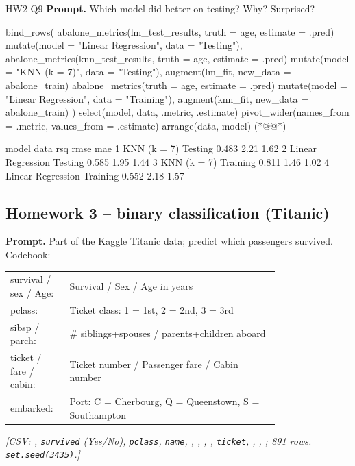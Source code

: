\begin{qbox}{HW2 Q9}
\textbf{Prompt.} Which model did better on testing? Why? Surprised?
\mine
\begin{rcode}
bind_rows(
  abalone_metrics(lm_test_results, truth = age, estimate = .pred) %
    mutate(model = "Linear Regression", data = "Testing"),
  abalone_metrics(knn_test_results, truth = age, estimate = .pred) %
    mutate(model = "KNN (k = 7)", data = "Testing"),
  augment(lm_fit, new_data = abalone_train) %
    abalone_metrics(truth = age, estimate = .pred) %
    mutate(model = "Linear Regression", data = "Training"),
  augment(knn_fit, new_data = abalone_train) %
) %
  select(model, data, .metric, .estimate) %
  pivot_wider(names_from = .metric, values_from = .estimate) %
  arrange(data, model)  (*@@*)
\end{rcode}
\begin{routput}
  model             data       rsq  rmse   mae
1 KNN (k = 7)       Testing  0.483  2.21  1.62
2 Linear Regression Testing  0.585  1.95  1.44
3 KNN (k = 7)       Training 0.811  1.46  1.02
4 Linear Regression Training 0.552  2.18  1.57
\end{routput}
\end{qbox}

\subsection{Homework 3 -- binary classification (Titanic)}
%
\textbf{Prompt.} Part of the Kaggle Titanic data; predict which passengers survived. Codebook:\par\noindent
{\footnotesize
\begin{tabular}{@{}l p{0.78\linewidth}@{}}
survival / sex / Age: & Survival / Sex / Age in years\\
pclass: & Ticket class: 1 = 1st, 2 = 2nd, 3 = 3rd\\
sibsp / parch: & \# siblings+spouses / parents+children aboard\\
ticket / fare / cabin: & Ticket number / Passenger fare / Cabin number\\
embarked: & Port: C = Cherbourg, Q = Queenstown, S = Southampton\\
\end{tabular}}
{\color{figgray}\itshape [CSV: , \texttt{survived} (Yes/No), \texttt{pclass}, \texttt{name}, , , , , \texttt{ticket}, , , ; 891 rows. \texttt{set.seed(3435)}.]}

